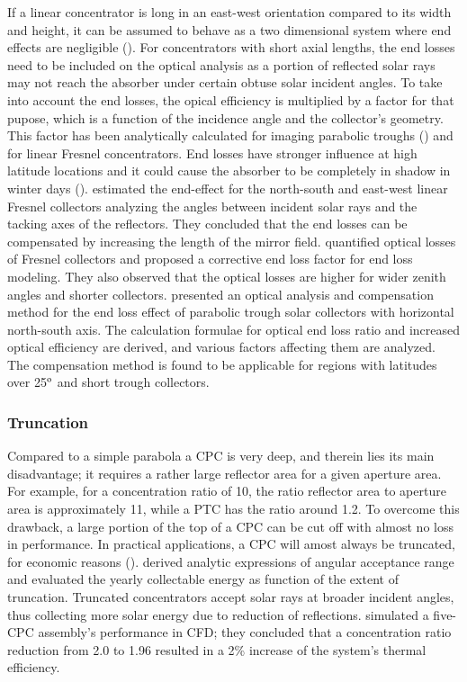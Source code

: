 If a linear concentrator is long in an east-west orientation compared to its width and height, it can be assumed to behave as a two dimensional system where end effects are negligible (\cite{Eames1993a}). For concentrators with short axial lengths, the end losses need to be included on the optical analysis as a portion of reflected solar rays may not reach the absorber under certain obtuse solar incident angles. To take into account the end losses, the opical efficiency is multiplied by a factor for that pupose, which is a function of the incidence angle and the collector's geometry. This factor has been analytically calculated for imaging parabolic troughs (\cite{Rabl1985}) and for linear Fresnel concentrators. End losses have stronger influence at high latitude locations and it could cause the absorber to be completely in shadow in winter days (\cite{Hongn2015}). \citet{Pu2011} estimated the end-effect for the north-south and east-west linear Fresnel collectors analyzing the angles between incident solar rays and the tacking axes of the reflectors. They concluded that the end losses can be compensated by increasing the length of the mirror field. \citet{Heimsath2014} quantified optical losses of Fresnel collectors and proposed a corrective end loss factor for end loss modeling. They also observed that the optical losses are higher for wider zenith angles and shorter collectors. \citet{Xu2014} presented an optical analysis and compensation method for the end loss effect of parabolic trough solar collectors with horizontal north-south axis. The calculation formulae for optical end loss ratio and increased optical efficiency are derived, and various factors affecting them are analyzed. The compensation method is found to be applicable for regions with latitudes over 25$^{\rm{o}}$ and short trough collectors.

\subsubsection{Truncation}

Compared to a simple parabola a CPC is very deep, and therein lies its main disadvantage; it requires a rather large reflector area for a given aperture area. For example, for a concentration ratio of 10, the ratio reflector area to aperture area is approximately 11, while a PTC has the ratio around 1.2. To overcome this drawback, a large portion of the top of a CPC can be cut off with almost no loss in performance. In practical applications, a CPC will amost always be truncated, for economic reasons (\cite{Rabl1976}). \citet{Carvalho1985} derived analytic expressions of angular acceptance range and evaluated the yearly collectable energy as function of the extent of truncation. Truncated concentrators accept solar rays at broader incident angles, thus collecting more solar energy due to reduction of reflections. \citet{Francesconi2018} simulated a five-CPC assembly's performance in CFD; they concluded that a concentration ratio reduction from 2.0 to 1.96 resulted in a 2\% increase of the system's thermal efficiency.

